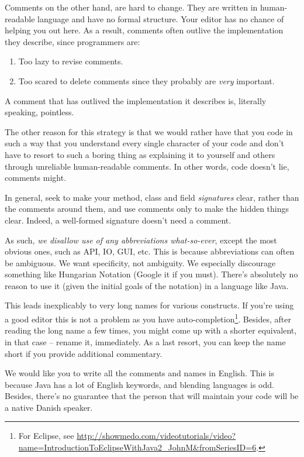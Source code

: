 Comments on the other hand, are hard to change. They are written in
human-readable language and have no formal structure. Your editor has no chance
of helping you out here. As a result, comments often outlive the implementation
they describe, since programmers are:

\begin{enumerate}

\item Too lazy to revise comments.

\item Too scared to delete comments since they probably are \emph{very}
important.

\end{enumerate}

A comment that has outlived the implementation it describes is, literally
speaking, pointless.

The other reason for this strategy is that we would rather have that you code
in such a way that you understand every single character of your code and don't
have to resort to such a boring thing as explaining it to yourself and others
through unreliable human-readable comments. In other words, code doesn't lie,
comments might.

In general, seek to make your method, class and field \emph{signatures} clear,
rather than the comments around them, and use comments only to make the hidden
things clear. Indeed, a well-formed signature doesn't need a comment.

As such, \emph{we disallow use of any abbreviations what-so-ever}, except the
most obvious ones, such as API, IO, GUI, etc. This is because abbreviations can
often be ambiguous. We want specificity, not ambiguity. We especially
discourage something like Hungarian Notation (Google it if you must). There's
absolutely no reason to use it (given the initial goals of the notation) in a
language like Java.

This leads inexplicably to very long names for various constructs. If you're
using a good editor this is not a problem as you have
auto-completion\footnote{For Eclipse, see
\url{http://showmedo.com/videotutorials/video?name=IntroductionToEclipseWithJava2_JohnM&fromSeriesID=6}.}.
Besides, after reading the long name a few times, you might come up with a
shorter equivalent, in that case -- rename it, immediately. As a last resort,
you can keep the name short if you provide additional commentary.

We would like you to write all the comments and names in English. This is
because Java has a lot of English keywords, and blending languages is odd.
Besides, there's no guarantee that the person that will maintain your code will
be a native Danish speaker.

